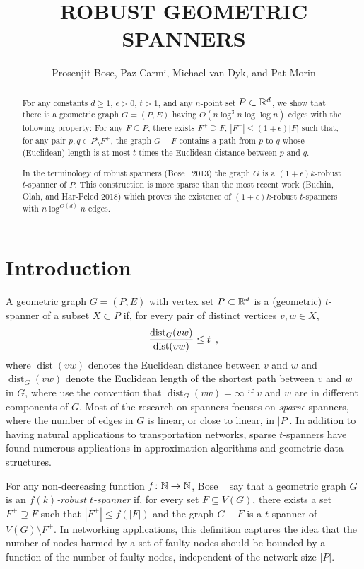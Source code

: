 \documentclass{patmorin}
\title{\MakeUppercase{Robust Geometric Spanners}}
\author{Prosenjit Bose, Paz Carmi, Michael van Dyk, and Pat Morin}
\DeclareMathOperator{\dist}{dist}
\begin{document}
\maketitle


\begin{abstract}
  For any constants $d\ge 1$, $\epsilon >0$, $t>1$, and any $n$-point
  set $P\subset\mathbb{R}^d$, we show that there is a geometric graph $G=(P,E)$
  having $O(n\log^3 n\log\log n)$ edges with the following property:
  For any $F\subseteq P$, there exists $F^+\supseteq F$, $|F^+| \le
  (1+\epsilon)|F|$ such that, for any pair $p,q\in P\setminus F^+$,
  the graph $G-F$ contains a path from $p$ to $q$ whose (Euclidean)
  length is at most $t$ times the Euclidean distance between $p$ and $q$.
  
  In the terminology of robust spanners (Bose \etal\ 2013) the graph $G$
  is a $(1+\epsilon)k$-robust $t$-spanner of $P$. This construction is
  more sparse than the most recent work (Buchin, Olah, and Har-Peled 2018)
  which proves the existence of $(1+\epsilon)k$-robust $t$-spanners with
  $n\log^{O(d)} n$ edges.
\end{abstract}

\section{Introduction}

A geometric graph $G=(P,E)$ with vertex set $P\subset\mathbb{R}^d$ is a (geometric)
$t$-spanner of a subset $X\subset P$ if, for every pair of distinct vertices
$v,w\in X$, 
\begin{equation}
	\frac{\dist_G(vw)}{\dist(vw)} \le t \enspace , \eqlabel{spanning-ratio}
\end{equation}
where $\dist(vw)$ denotes the Euclidean distance between $v$ and $w$ and
$\dist_G(vw)$ denote the Euclidean length of the shortest path between $v$
and $w$ in $G$, where use the convention that $\dist_G(vw)=\infty$ if $v$
and $w$ are in different components of $G$.  
Most of the research on spanners focuses on \emph{sparse}
spanners, where the number of edges in $G$ is linear, or close to linear,
in $|P|$.  In addition to having natural applications to transportation
networks, sparse $t$-spanners have found numerous applications in
approximation algorithms and geometric data structures.

For any non-decreasing function $f\colon\mathbb{N}\to\mathbb{N}$, Bose \etal\
\cite{bose.dujmovic.ea:robust} say that a geometric graph $G$ is an
\emph{$f(k)$-robust $t$-spanner} if, for every set $F\subseteq V(G)$,
there exists a set $F^+\supseteq F$ such that $|F^+|\le f(|F|)$ and
the graph $G-F$ is a $t$-spanner of $V(G)\setminus F^+$.  In networking
applications, this definition captures the idea that the number of nodes
harmed by a set of faulty nodes should be bounded by a function of the
number of faulty nodes, independent of the network size $|P|$.
\end{document}
